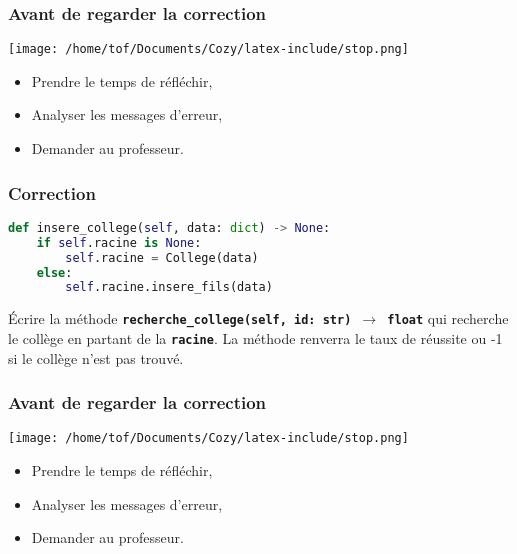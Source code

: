 \documentclass[svgnames,11pt]{beamer}
\begin{document}
\begin{frame}
    \frametitle{Avant de regarder la correction}
\begin{center}
    \centering
    \texttt{[image: /home/tof/Documents/Cozy/latex-include/stop.png]}
    \end{center}
{\Large
    \begin{itemize}
        \item Prendre le temps de réfléchir,
        \item Analyser les messages d'erreur,
        \item Demander au professeur.
    \end{itemize}
}
\end{frame}
\begin{frame}[fragile]
    \frametitle{Correction}

\begin{center}
\begin{lstlisting}[language=Python , basicstyle=\ttfamily\small, xleftmargin=2em, xrightmargin=2em]
def insere_college(self, data: dict) -> None:
    if self.racine is None:
        self.racine = College(data)
    else:
        self.racine.insere_fils(data)
\end{lstlisting}
\end{center}   

\end{frame}
\begin{frame}

    \begin{activite}
    Écrire la méthode \textbf{\texttt{recherche\_college(self, id: str) $\rightarrow$ float}} qui recherche le collège en partant de la \textbf{\texttt{racine}}. La méthode renverra le taux de réussite ou -1 si le collège n'est pas trouvé.
    \end{activite}
    
    \end{frame}
    \begin{frame}
        \frametitle{Avant de regarder la correction}
    \begin{center}
        \centering
        \texttt{[image: /home/tof/Documents/Cozy/latex-include/stop.png]}
        \end{center}
    {\Large
        \begin{itemize}
            \item Prendre le temps de réfléchir,
            \item Analyser les messages d'erreur,
            \item Demander au professeur.
        \end{itemize}
    }
    \end{frame}
\end{document}
